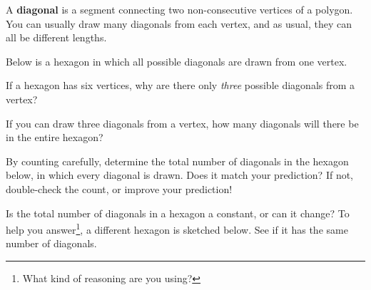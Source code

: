 A \textbf{diagonal} is a segment connecting two non-consecutive vertices of a polygon.
You can usually draw many diagonals from each vertex,
and as usual, they can all be different lengths.

\newpage

Below is a hexagon in which all possible diagonals are drawn from one vertex.
	\begin{center}
	\end{center}
\noindent \q If a hexagon has six vertices, why are there only \emph{three} possible diagonals from a vertex?

\medskip

\noindent \q If you can draw three diagonals from a vertex, 
how many diagonals will there be in the entire hexagon?

\medskip

\noindent \q By counting carefully, 
determine the total number of diagonals in the hexagon below,
in which every diagonal is drawn.
Does it match your prediction?
If not, double-check the count, or improve your prediction!
	\begin{center}
	\end{center}

\noindent \q Is the total number of diagonals in a hexagon a constant,
or can it change? 
To help you answer\footnote{
What kind of reasoning are you using?}, a different hexagon is sketched below. 
See if it has the same number of diagonals.
	\begin{center}
	\end{center}


